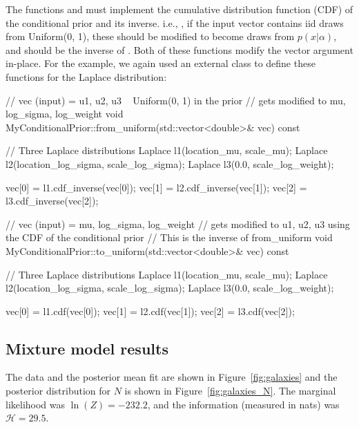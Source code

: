 \documentclass[article, nojss]{jss}
\begin{document}
The functions  and  must implement
the cumulative distribution function (CDF) of the conditional
prior and its inverse. i.e., , if the input vector contains
iid draws from Uniform(0, 1), these should be modified to become draws from
$p(x|\alpha)$, and  should be the inverse of
.
Both of these functions modify the vector argument in-place.
For the example, we again used an external class to define these functions
for the Laplace distribution:

\begin{CodeChunk}
\begin{CodeInput}
// vec (input) = {u1, u2, u3} ~ Uniform(0, 1) in the prior
// gets modified to {mu, log_sigma, log_weight}
void MyConditionalPrior::from_uniform(std::vector<double>& vec) const
{
    // Three Laplace distributions
    Laplace l1(location_mu, scale_mu);
    Laplace l2(location_log_sigma, scale_log_sigma);
    Laplace l3(0.0, scale_log_weight);

    vec[0] = l1.cdf_inverse(vec[0]);
    vec[1] = l2.cdf_inverse(vec[1]);
    vec[2] = l3.cdf_inverse(vec[2]);
}

// vec (input) = {mu, log_sigma, log_weight}
// gets modified to {u1, u2, u3} using the CDF of the conditional prior
// This is the inverse of from_uniform
void MyConditionalPrior::to_uniform(std::vector<double>& vec) const
{
    // Three Laplace distributions
    Laplace l1(location_mu, scale_mu);
    Laplace l2(location_log_sigma, scale_log_sigma);
    Laplace l3(0.0, scale_log_weight);

    vec[0] = l1.cdf(vec[0]);
    vec[1] = l2.cdf(vec[1]);
    vec[2] = l3.cdf(vec[2]);
}
\end{CodeInput}
\end{CodeChunk}

\subsection{Mixture model results}
The data and the posterior mean fit are shown
in Figure~\ref{fig:galaxies} and the posterior distribution for
$N$ is shown in Figure~\ref{fig:galaxies_N}.
The marginal likelihood was $\ln(Z) = -232.2$, and
the information (measured in nats) was $\mathcal{H} = 29.5$.
\end{document}
